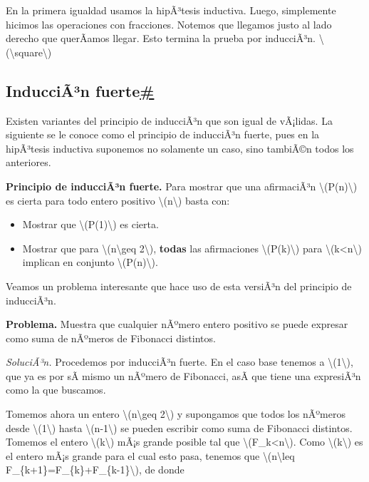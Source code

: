 En la primera igualdad usamos la hipÃ³tesis inductiva. Luego,
simplemente hicimos las operaciones con fracciones. Notemos que llegamos
justo al lado derecho que querÃ­amos llegar. Esto termina la prueba por
inducciÃ³n. {{\textbackslash(\textbackslash square\textbackslash)}}

\label{induccion-fuerte}
\subsection{\texorpdfstring{InducciÃ³n
fuerte\hyperref[induccion-fuerte]{\#}}{InducciÃ³n fuerte\#}}\label{inducciuxe3uxb3n-fuerte}

Existen variantes del principio de inducciÃ³n que son igual de vÃ¡lidas.
La siguiente se le conoce como el principio de inducciÃ³n fuerte, pues
en la hipÃ³tesis inductiva suponemos no solamente un caso, sino tambiÃ©n
todos los anteriores.

\textbf{Principio de inducciÃ³n fuerte.} Para mostrar que una
afirmaciÃ³n {\textbackslash(P(n)\textbackslash)} es cierta para todo
entero positivo {\textbackslash(n\textbackslash)} basta con:

\begin{itemize}
\item
  Mostrar que {\textbackslash(P(1)\textbackslash)} es cierta.
\item
  Mostrar que para {\textbackslash(n\textbackslash geq
  2\textbackslash)}, \textbf{todas} las afirmaciones
  {\textbackslash(P(k)\textbackslash)} para
  {\textbackslash(k\textless n\textbackslash)} implican en conjunto
  {\textbackslash(P(n)\textbackslash)}.
\end{itemize}

Veamos un problema interesante que hace uso de esta versiÃ³n del
principio de inducciÃ³n.

\textbf{Problema.} Muestra que cualquier nÃºmero entero positivo se
puede expresar como suma de nÃºmeros de Fibonacci distintos.

\emph{SoluciÃ³n.} Procedemos por inducciÃ³n fuerte. En el caso base
tenemos a {\textbackslash(1\textbackslash)}, que ya es por sÃ­ mismo un
nÃºmero de Fibonacci, asÃ­ que tiene una expresiÃ³n como la que buscamos.

Tomemos ahora un entero {\textbackslash(n\textbackslash geq
2\textbackslash)} y supongamos que todos los nÃºmeros desde
{\textbackslash(1\textbackslash)} hasta
{\textbackslash(n-1\textbackslash)} se pueden escribir como suma de
Fibonacci distintos. Tomemos el entero {\textbackslash(k\textbackslash)}
mÃ¡s grande posible tal que
{\textbackslash(F\_k\textless n\textbackslash)}. Como
{\textbackslash(k\textbackslash)} es el entero mÃ¡s grande para el cual
esto pasa, tenemos que {\textbackslash(n\textbackslash leq
F\_\{k+1\}=F\_\{k\}+F\_\{k-1\}\textbackslash)}, de donde

